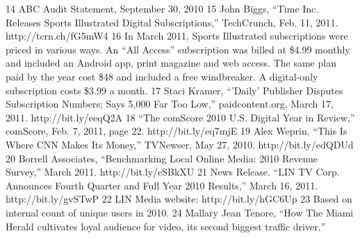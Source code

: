 14 ABC Audit Statement, September 30, 2010
15 John Biggs, ``Time Inc. Releases Sports Illustrated Digital Subscriptions,'' TechCrunch,
Feb. 11, 2011. http://tcrn.ch/fG5mW4
16 In March 2011, Sports Illustrated subscriptions were priced in various ways. An ``All Access''
subscription was billed at \$4.99 monthly and included an Android app, print magazine and
web access. The same plan paid by the year cost \$48 and included a free windbreaker.
A digital-only subscription costs \$3.99 a month.
17 Staci Kramer, ``'Daily' Publisher Disputes Subscription Numbers; Says 5,000 Far Too Low,''
paidcontent.org, March 17, 2011. http://bit.ly/eeqQ2A
18 ``The comScore 2010 U.S. Digital Year in Review,'' comScore, Feb. 7, 2011, page 22.
http://bit.ly/eq7mjE
19 Alex Weprin, ``This Is Where CNN Makes Its Money,'' TVNewser, May 27, 2010.
http://bit.ly/edQDUd
20 Borrell Associates, ``Benchmarking Local Online Media: 2010 Revenue Survey,'' March 2011.
http://bit.ly/eSBkXU
21 News Release. ``LIN TV Corp. Announces Fourth Quarter and Full Year 2010 Results,''
March 16, 2011. http://bit.ly/gvSTwP
22 LIN Media website: http://bit.ly/hGC6Up
23 Based on internal count of unique users in 2010.
24 Mallary Jean Tenore, ``How The Miami Herald cultivates loyal audience for video, its second
biggest traffic driver,''


